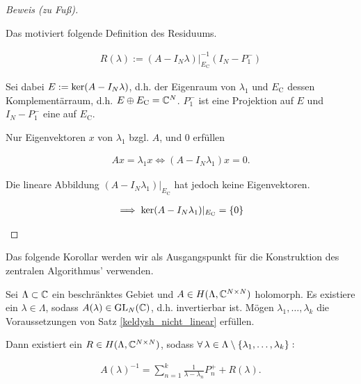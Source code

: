 \begin{proof}[Beweis (zu Fuß)]
\begin{enumerate}[label = (\roman*)]
        Das motiviert folgende Definition des Residuums.

        \begin{align*}
            R(\lambda)
            :=
            (A - I_N \lambda) |_{E_\mathrm{C}}^{-1} (I_N - P_1^-)
        \end{align*}

        Sei dabei $E := \operatorname{ker}(A - I_N \lambda)$, d.h. der Eigenraum von $\lambda_1$ und $E_\mathrm{C}$ dessen Komplementärraum, d.h. $E \oplus E_\mathrm{C} = \mathbb{C}^N$.
        $P_1^-$ ist eine Projektion auf $E$ und $I_N - P_1^-$ eine auf $E_\mathrm{C}$.

        Nur Eigenvektoren $x$ von $\lambda_1$ bzgl. $A$, und $0$ erfüllen

        \begin{align*}
            A x = \lambda_1 x
            \iff
            (A - I_N \lambda_1) x = 0.
        \end{align*}

        Die lineare Abbildung $(A - I_N \lambda_1) |_{E_\mathrm{C}}$ hat jedoch keine Eigenvektoren.

        \begin{align*}
            \implies
            \operatorname{ker}(A - I_N \lambda_1) |_{E_\mathrm{C}} = {\left \{ 0 \right \}}
        \end{align*}



    \end{enumerate}

\end{proof}

Das folgende Korollar werden wir als Ausgangspunkt für die Konstruktion des zentralen Algorithmus' verwenden.

\begin{corollary} \label{keldysh_multi}

    Sei $\Lambda \subset \mathbb{C}$ ein beschränktes Gebiet und $A \in H(\Lambda, \mathbb{C}^{N \times N})$ holomorph.
    Es existiere ein $\lambda \in \Lambda$, sodass $A(\lambda) \in \operatorname{GL}_N(\mathbb{C})$, d.h. invertierbar ist.
    Mögen $\lambda_1, \dots, \lambda_k$ die Voraussetzungen von Satz \ref{keldysh_nicht_linear} erfüllen.

    Dann existiert ein $R \in H(\Lambda, \mathbb{C}^{N \times N})$, sodass $\forall \, \lambda \in \Lambda \setminus {\left \{ \lambda_1, \dots, \lambda_k \right \}}:$

    \begin{align*}
        A(\lambda)^{-1}
        =
        \sum_{n=1}^k
            \frac{1}{\lambda - \lambda_n} P_n^+
        +
        R(\lambda).
    \end{align*}

\end{corollary}

